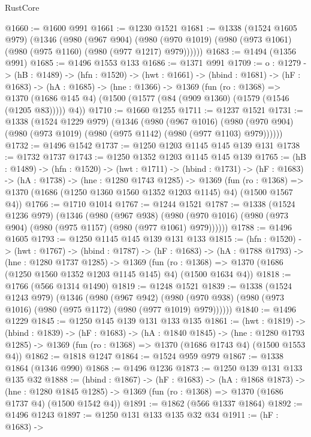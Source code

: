 \begin{lexlean}{RustCore}
\begin{coremodule}
@1660 := @1600 @991
@1661 := @1230 @1521
@1681 := @1338
    (@1524 @1605 @979)
    (@1346
      (@980
        (@967 @904)
        (@980 (@970 @1019) (@980 (@973 @1061) (@980 (@975 @1160) (@980 (@977 @1217) @979))))))
@1683 := @1494 (@1356 @991)
@1685 := @1496 @1553 @133
@1686 := @1371 @991
@1709 := {o : @1279} ->
  (hB : @1489) ->
  (hfn : @1520) ->
  (hwt : @1661) ->
  (hbind : @1681) ->
  (hF : @1683) ->
  (hA : @1685) ->
  (hne : @1366) ->
  @1369
    (fun (ro : @1368) =>
    @1370 (@1686 @145 @4) (@1500 (@1577 (@84 (@909 @1360) (@1579 (@1546 (@1205 @83))))) @4))
@1710 := @1660 @1255
@1711 := @1237 @1521
@1731 := @1338
    (@1524 @1229 @979)
    (@1346
      (@980
        (@967 @1016)
        (@980 (@970 @904) (@980 (@973 @1019) (@980 (@975 @1142) (@980 (@977 @1103) @979))))))
@1732 := @1496 @1542
@1737 := @1250 @1203 @1145 @145 @139 @131
@1738 := @1732 @1737
@1743 := @1250 @1352 @1203 @1145 @145 @139
@1765 := (hB : @1489) ->
  (hfn : @1520) ->
  (hwt : @1711) ->
  (hbind : @1731) ->
  (hF : @1683) ->
  (hA : @1738) ->
  (hne : @1280 @1743 @1285) ->
  @1369
    (fun (ro : @1368) => @1370 (@1686 (@1250 @1360 @1560 @1352 @1203 @1145) @4) (@1500 @1567 @4))
@1766 := @1710 @1014
@1767 := @1244 @1521
@1787 := @1338
    (@1524 @1236 @979)
    (@1346
      (@980
        (@967 @938)
        (@980 (@970 @1016) (@980 (@973 @904) (@980 (@975 @1157) (@980 (@977 @1061) @979))))))
@1788 := @1496 @1605
@1793 := @1250 @1145 @145 @139 @131 @133
@1815 := (hfn : @1520) ->
  (hwt : @1767) ->
  (hbind : @1787) ->
  (hF : @1683) ->
  (hA : @1788 @1793) ->
  (hne : @1280 @1737 @1285) ->
  @1369 (fun (ro : @1368) => @1370 (@1686 (@1250 @1560 @1352 @1203 @1145 @145) @4) (@1500 @1634 @4))
@1818 := @1766 (@566 @1314 @1490)
@1819 := @1248 @1521
@1839 := @1338
    (@1524 @1243 @979)
    (@1346
      (@980
        (@967 @942)
        (@980 (@970 @938) (@980 (@973 @1016) (@980 (@975 @1172) (@980 (@977 @1019) @979))))))
@1840 := @1496 @1229
@1845 := @1250 @145 @139 @131 @133 @135
@1861 := (hwt : @1819) ->
  (hbind : @1839) ->
  (hF : @1683) ->
  (hA : @1840 @1845) ->
  (hne : @1280 @1793 @1285) -> @1369 (fun (ro : @1368) => @1370 (@1686 @1743 @4) (@1500 @1553 @4))
@1862 := @1818 @1247
@1864 := @1524 @959 @979
@1867 := @1338 @1864 (@1346 @990)
@1868 := @1496 @1236
@1873 := @1250 @139 @131 @133 @135 @32
@1888 := (hbind : @1867) ->
  (hF : @1683) ->
  (hA : @1868 @1873) ->
  (hne : @1280 @1845 @1285) -> @1369 (fun (ro : @1368) => @1370 (@1686 @1737 @4) (@1500 @1542 @4))
@1891 := @1862 (@566 @1337 @1864)
@1892 := @1496 @1243
@1897 := @1250 @131 @133 @135 @32 @34
@1911 := (hF : @1683) ->

\end{coremodule}
\end{lexlean}
